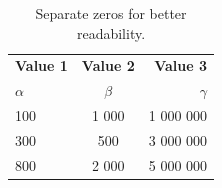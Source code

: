 \documentclass[a4paper,12pt]{article}
\begin{document}
\begin{table}[h!]
  \begin{center}
    \label{tab:table1}
    \begin{tabular}{l|c|r} %
      \textbf{Value 1} & \textbf{Value 2} & \textbf{Value 3}\\
      $\alpha$ & $\beta$ & $\gamma$ \\
      \hline
      100 & 1 000 & 1 000 000\\
      300 & 500 & 3 000 000\\
      800 & 2 000 & 5 000 000\\
    \end{tabular}
    \caption{Separate zeros for better readability. \cite{AAB95}}
  \end{center}
\end{table}
\noindent \blindtext \cite{AlGr}

	\newpage
	
	\printbibliography[heading=bibintoc]
	
	
\end{document}
